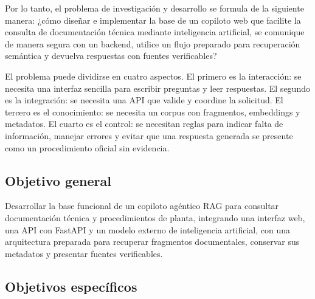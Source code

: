 Por lo tanto, el problema de investigación y desarrollo se formula de la siguiente manera: ¿cómo diseñar e implementar la base de un copiloto web que facilite la consulta de documentación técnica mediante inteligencia artificial, se comunique de manera segura con un backend, utilice un flujo preparado para recuperación semántica y devuelva respuestas con fuentes verificables?

El problema puede dividirse en cuatro aspectos. El primero es la interacción: se necesita una interfaz sencilla para escribir preguntas y leer respuestas. El segundo es la integración: se necesita una API que valide y coordine la solicitud. El tercero es el conocimiento: se necesita un corpus con fragmentos, embeddings y metadatos. El cuarto es el control: se necesitan reglas para indicar falta de información, manejar errores y evitar que una respuesta generada se presente como un procedimiento oficial sin evidencia.

\subsection{Objetivo general}

Desarrollar la base funcional de un copiloto agéntico RAG para consultar documentación técnica y procedimientos de planta, integrando una interfaz web, una API con FastAPI y un modelo externo de inteligencia artificial, con una arquitectura preparada para recuperar fragmentos documentales, conservar sus metadatos y presentar fuentes verificables.

\subsection{Objetivos específicos}

